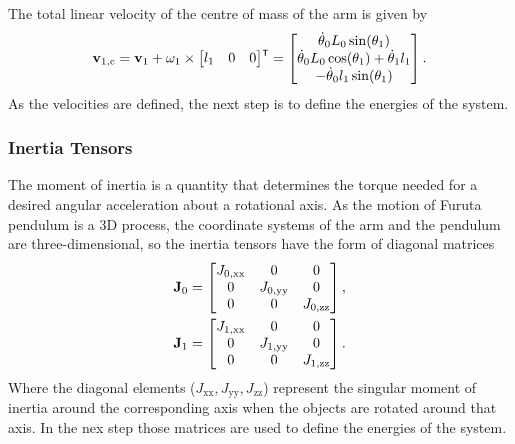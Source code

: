 The total linear velocity of the centre of mass of the arm is
given by
\begin{equation}
	\text{\textbf{v}}_{1,\text{c}} = \text{\textbf{v}}_1+\omega_1\times
		\begin{bmatrix}
			l_1 & 0& 0
		\end{bmatrix}^\intercal=
	\begin{bmatrix}
		\dot{\theta}_0L_0\sin(\theta_1)\\
		\dot{\theta}_0L_0\cos(\theta_1) + \dot{\theta}_1l_1\\
		-\dot{\theta}_0l_1\sin(\theta_1)
	\end{bmatrix}.														
\end{equation}
As the velocities are defined, the next step is to define the energies of the system.
\subsubsection{Inertia Tensors}
The moment of inertia is a quantity that determines the torque needed for a desired angular acceleration about a rotational axis. As the motion of Furuta pendulum is a 3D process, the coordinate systems of the arm and the pendulum are three-dimensional, so the inertia tensors have the form of diagonal matrices
\begin{subequations}
	\begin{align}
	\text{\textbf{J}}_0 = 	\begin{bmatrix}
	J_{0,\text{xx}} & 0 & 0\\
	0 & J_{0,\text{yy}} & 0\\
	0 & 0 & J_{0,\text{zz}}\\
	\end{bmatrix},\\
	\text{\textbf{J}}_1 = 	\begin{bmatrix}
	J_{1,\text{xx}} & 0 & 0\\
	0 & J_{1,\text{yy}} & 0\\
	0 & 0 & J_{1,\text{zz}}\\
	\end{bmatrix}.
	\end{align}
\end{subequations}
Where the diagonal elements ($J_{\text{xx}},J_{\text{yy}},J_{\text{zz}}$) represent the singular moment of inertia around the corresponding axis when the objects are rotated around that axis. In the nex step those matrices are used to define the energies of the system.
